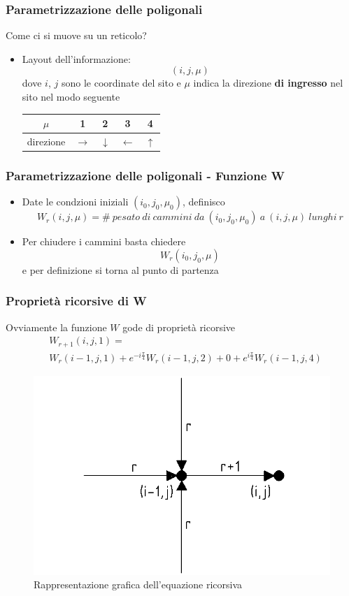 \documentclass[11pt]{beamer}
\begin{document}
\begin{frame}
\frametitle{Parametrizzazione delle poligonali}
Come ci si muove su un reticolo?
\begin{itemize}
\item<1->{Layout dell'informazione:
$$(i,j,\mu)$$
dove $i$, $j$ sono le coordinate del sito e $\mu$ indica la direzione \textbf{di ingresso} nel sito nel modo seguente \\

\begin{center}
\begin{tabular}{| c | c | c | c | c | }
  \hline                       
  $\mu$ & 1 & 2 & 3 & 4 \\ \hline
    direzione & $\rightarrow$ & $\downarrow$ & $\leftarrow$ & $\uparrow$ \\
  \hline  
\end{tabular}
\end{center}
}
\end{itemize}

\end{frame}

\begin{frame}
\frametitle{Parametrizzazione delle poligonali - Funzione W}
\begin{itemize}
\item{Date le condzioni iniziali $(i_0,j_0,\mu_0)$, definisco
$$W_r(i,j,\mu) =  \# \ pesato \ di \ cammini \ da \ (i_0,j_0,\mu_0) \ a \ (i,j,\mu) \ lunghi \ r
$$}
\item{Per chiudere i cammini basta chiedere
$$
W_r(i_0,j_0,\mu)
$$
e per definizione si torna al punto di partenza}
\end{itemize}

\end{frame}

\begin{frame}
\frametitle{Proprietà ricorsive di W}
Ovviamente la funzione $W$ gode di proprietà ricorsive
\begin{equation}
\begin{split}
&W_{r+1}(i,j,1)  = \\&W_r(i-1,j,1)+e^{-i\frac{\pi}{4}}W_r(i-1,j,2)+0+e^{i\frac{\pi}{4}}W_r(i-1,j,4) 
\end{split}
\end{equation}
\begin{figure}[h]
\centering
\includegraphics[width=0.7\columnwidth]{v7}
\caption{Rappresentazione grafica dell'equazione ricorsiva}
\label{v7}
\end{figure}
\end{frame}
\end{document}
